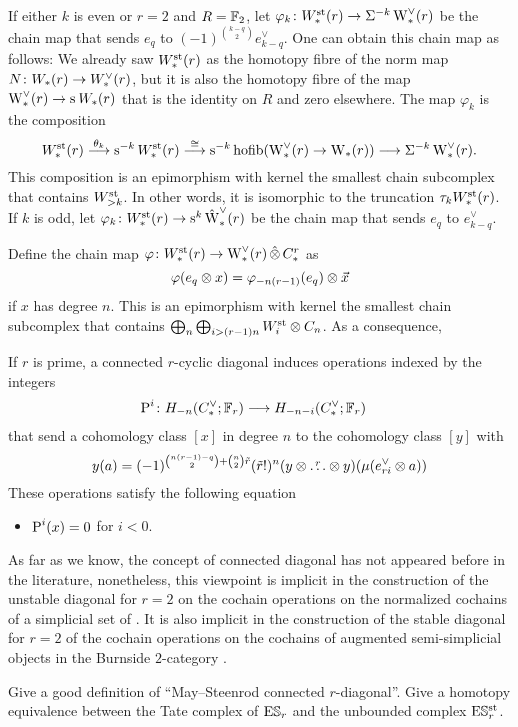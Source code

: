 If either $k$ is even or $r=2$ and $R=\bF_2$, let $\varphi_k \colon \Wst(r) \to \susp{-k}\rWd(r)$ be the chain map that sends $e_q$ to $(-1)^{\binom{k-q}{2}}e_{k-q}^{\vee}$.
One can obtain this chain map as follows: We already saw $\Wst(r)$ as the homotopy fibre of the norm map $N \colon \W(r) \to \Wd(r)$, but it is also the homotopy fibre of the map $\rWd(r) \to \sus{}\W(r)$ that is the identity on $R$ and zero elsewhere.
The map $\varphi_k$ is the composition
\[
\Wst(r)\overset{\theta_k}{\lra} \sus{-k} \Wst(r) \overset{\cong}{\lra} \sus{-k}\hofib(\rWd(r) \to \rW(r)) \lra \susp{-k}\rWd(r).
\]
This composition is an epimorphism with kernel the smallest chain subcomplex that contains $\Wst[>k]$.
In other words, it is isomorphic to the truncation $\tau_k \Wst(r)$.
If $k$ is odd, let $\varphi_k \colon \Wst(r) \to \sus{k}\rWhatd(r)$ be the chain map that sends $e_q$ to $e_{k-q}^{\vee}$.

Define the chain map $\varphi \colon \Wst(r) \to \rWd(r) \hotimes \rucadenas$ as
\[
\varphi(e_q \ot x) = \varphi_{-n(r-1)}(e_{q}) \ot \vec{x}
\]
if $x$ has degree $n$.
This is an epimorphism with kernel the smallest chain subcomplex that contains $\bigoplus_n\bigoplus_{i>(r-1)n} \Wst[i] \ot \ucadenas[n]$.
As a consequence,

\begin{proposition}
	If $r$ is prime, a connected $r$-cyclic diagonal induces operations indexed by the integers
	\begin{align*}
		\power^{i} \colon H_{-n}(\ucocadenas;\mathbb{F}_r)& \lra H_{-n-i}(\ucocadenas;\mathbb{F}_r)
	\end{align*}
	that send a cohomology class $[x]$ in degree $n$ to the cohomology class $[y]$ with
	\[
	y(a) = (-1)^{\binom{n(r-1)-q}{2} + \binom{n}{2}\tilde{r}}(\tilde{r}!)^n(y \ot \overset{r}{\dots} \ot y)(\mu(e_{ri}^\vee \ot a))
	\]
	These operations satisfy the following equation
	\begin{itemize}
		\item $\power^i(x) = 0$ for $i<0$.
	\end{itemize}
\end{proposition}

\begin{example}
	As far as we know, the concept of connected diagonal has not appeared before in the literature, nonetheless, this viewpoint is implicit in the construction of the unstable diagonal for $r=2$ on the cochain operations on the normalized cochains of a simplicial set of \cite{medina2021fast_sq}.
	It is also implicit in the construction of the stable diagonal for $r=2$ of the cochain operations on the cochains of augmented semi-simplicial objects in the Burnside $2$-category \cite{cantero-moran2020khovanov}.
\end{example}

\begin{question}
	Give a good definition of ``May--Steenrod connected $r$-diagonal''.
	Give a homotopy equivalence between the Tate complex of $\ES_r$ and the unbounded complex $\ESst_r$.
\end{question}